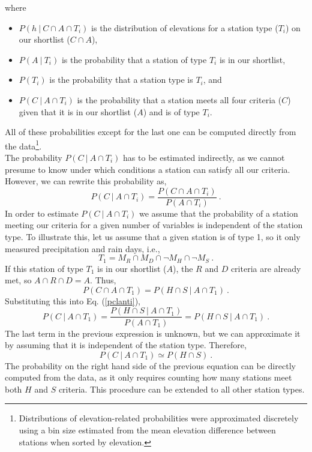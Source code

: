 \documentclass[a4paper,fleqn,usenatbib]{mnras}
\begin{document}
where 
\begin{itemize}
\item $P(h\ |\ C\cap A\cap T_i)$ is the distribution of elevations for a station type ($T_i$) on our shortlist ($C\cap A$), 
\item $P(A\ |\ T_i)$ is the probability that a station of type $T_i$ is in our shortlist, 
\item $P(T_i)$ is the probability that a station type is $T_i$, and 
\item $P(C\ |\ A\cap T_i)$ is the probability that a station meets all four criteria ($C$) given that it is in our shortlist ($A$) and is of type $T_i$. 
\end{itemize}
All of these probabilities except for the last one can be computed directly from the data\footnote{Distributions of elevation-related probabilities were approximated discretely using a bin size estimated from the mean elevation difference between stations when sorted by elevation. }.\\

The probability $P(C\ |\ A\cap T_i)$ has to be estimated indirectly, as we cannot presume to know under which conditions a station can satisfy all our criteria. However, we can rewrite this probability as,
\begin{equation}\label{pclanti}
P(C\ |\ A\cap T_i)=\frac{P(C\cap A\cap T_i)}{P(A\cap T_i)}\  .
\end{equation}
In order to estimate $P(C\ |\ A\cap T_i)$ we assume that the probability of a station meeting our criteria for a given number of variables is independent of the station type. To illustrate this, let us assume that a given station is of type 1, so it only measured precipitation and rain days, i.e.,
\begin{equation}
T_1=M_R\cap M_D\cap\neg M_H\cap\neg M_S\ .
\end{equation}
If this station of type $T_1$ is in our shortlist ($A$), the $R$ and $D$ criteria are already met, so $A\cap R \cap D=A$. Thus,
\begin{equation}
P(C\cap A\cap T_1)=P( H\cap S\ |\ A\cap T_1)\ .
\end{equation}
Substituting this into Eq. (\ref{pclanti}),
\begin{equation}
P(C\ |\ A\cap T_1)=\frac{P( H\cap S\ |\ A\cap T_1)}{P(A\cap T_1)}=P(H\cap S\ |\ A\cap T_1) \ .
\end{equation}
The last term in the previous expression is unknown, but we can approximate it by assuming that it is independent of the station type. Therefore, 
\begin{equation}
P(C\ |\ A\cap T_1)\simeq P(H\cap S)\ .
\end{equation}
The probability on the right hand side of the previous equation can be directly computed from the data, as it only requires counting how many stations meet both $H$ and $S$ criteria. This procedure can be extended to all other station types.\\
\end{document}
